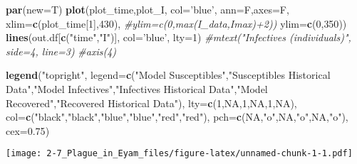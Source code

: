 \documentclass[
]{article}
\newenvironment{Shaded}{\begin{snugshade}}{\end{snugshade}}
\newcommand{\CommentTok}[1]{\textcolor[rgb]{0.56,0.35,0.01}{\textit{#1}}}
\newcommand{\DataTypeTok}[1]{\textcolor[rgb]{0.13,0.29,0.53}{#1}}
\newcommand{\DecValTok}[1]{\textcolor[rgb]{0.00,0.00,0.81}{#1}}
\newcommand{\FloatTok}[1]{\textcolor[rgb]{0.00,0.00,0.81}{#1}}
\newcommand{\KeywordTok}[1]{\textcolor[rgb]{0.13,0.29,0.53}{\textbf{#1}}}
\newcommand{\NormalTok}[1]{#1}
\newcommand{\OtherTok}[1]{\textcolor[rgb]{0.56,0.35,0.01}{#1}}
\newcommand{\StringTok}[1]{\textcolor[rgb]{0.31,0.60,0.02}{#1}}
\begin{document}
\begin{Shaded}
\begin{Highlighting}[]
\KeywordTok{par}\NormalTok{(}\DataTypeTok{new=}\NormalTok{T)}
\KeywordTok{plot}\NormalTok{(plot_time,plot_I, }\DataTypeTok{col=}\StringTok{'blue'}\NormalTok{, }
     \DataTypeTok{ann=}\NormalTok{F,}\DataTypeTok{axes=}\NormalTok{F, }
     \DataTypeTok{xlim=}\KeywordTok{c}\NormalTok{(plot_time[}\DecValTok{1}\NormalTok{],}\DecValTok{430}\NormalTok{), }\CommentTok{#ylim=c(0,max(I_data,Imax)+2))}
     \DataTypeTok{ylim=}\KeywordTok{c}\NormalTok{(}\DecValTok{0}\NormalTok{,}\DecValTok{350}\NormalTok{))}
\KeywordTok{lines}\NormalTok{(out.df[}\KeywordTok{c}\NormalTok{(}\StringTok{"time"}\NormalTok{,}\StringTok{"I"}\NormalTok{)], }\DataTypeTok{col=}\StringTok{'blue'}\NormalTok{, }\DataTypeTok{lty=}\DecValTok{1}\NormalTok{)}
\CommentTok{#mtext("Infectives (individuals)", side=4, line=3)}
\CommentTok{#axis(4)}

\KeywordTok{legend}\NormalTok{(}\StringTok{"topright"}\NormalTok{,}
       \DataTypeTok{legend=}\KeywordTok{c}\NormalTok{(}\StringTok{"Model Susceptibles"}\NormalTok{,}\StringTok{"Susceptibles Historical Data"}\NormalTok{,}\StringTok{"Model Infectives"}\NormalTok{,}\StringTok{"Infectives Historical Data"}\NormalTok{,}\StringTok{"Model Recovered"}\NormalTok{,}\StringTok{"Recovered Historical Data"}\NormalTok{),}
       \DataTypeTok{lty=}\KeywordTok{c}\NormalTok{(}\DecValTok{1}\NormalTok{,}\OtherTok{NA}\NormalTok{,}\DecValTok{1}\NormalTok{,}\OtherTok{NA}\NormalTok{,}\DecValTok{1}\NormalTok{,}\OtherTok{NA}\NormalTok{),}
       \DataTypeTok{col=}\KeywordTok{c}\NormalTok{(}\StringTok{"black"}\NormalTok{,}\StringTok{"black"}\NormalTok{,}\StringTok{"blue"}\NormalTok{,}\StringTok{"blue"}\NormalTok{,}\StringTok{"red"}\NormalTok{,}\StringTok{"red"}\NormalTok{), }
       \DataTypeTok{pch=}\KeywordTok{c}\NormalTok{(}\OtherTok{NA}\NormalTok{,}\StringTok{"o"}\NormalTok{,}\OtherTok{NA}\NormalTok{,}\StringTok{"o"}\NormalTok{,}\OtherTok{NA}\NormalTok{,}\StringTok{"o"}\NormalTok{),}
       \DataTypeTok{cex=}\FloatTok{0.75}\NormalTok{)}
\end{Highlighting}
\end{Shaded}

\texttt{[image: 2-7\_Plague\_in\_Eyam\_files/figure-latex/unnamed-chunk-1-1.pdf]}
\end{document}
